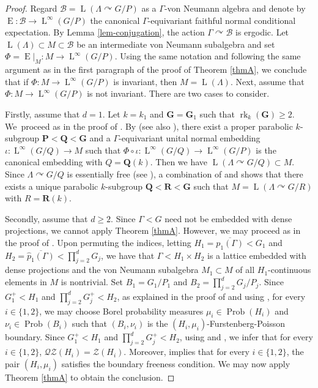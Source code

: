 \documentclass[11pt]{article}
\newcommand{\bG}{\boldsymbol{G}}
\newcommand{\bP}{\boldsymbol{P}}
\newcommand{\bQ}{\boldsymbol{Q}}
\newcommand{\bR}{\boldsymbol{R}}
\theoremstyle{definition}
\DeclareMathOperator{\Prob}{Prob}
\DeclareMathOperator{\rk}{rk}
\DeclareMathOperator{\rE}{ E}
\DeclareMathOperator{\rL}{L}
\begin{document}
\begin{proof}
Regard $\mathscr B = \rL(\Lambda \curvearrowright G/P)$ as a $\Gamma$-von Neumann algebra and denote by \hbox{$\rE : \mathscr B \to \rL^\infty(G/P)$} the canonical $\Gamma$-equivariant faithful normal conditional expectation. By Lemma \ref{lem-conjugation}, the action $\Gamma \curvearrowright \mathscr B$ is ergodic. Let $\rL(\Lambda) \subset M \subset \mathscr B$ be an intermediate von Neumann subalgebra and set $\Phi = \rE|_M : M \to \rL^\infty(G/P)$. \hbox{Using} the same notation and following the same argument as in the first paragraph of the proof of Theorem \ref{thmA}, we conclude that if $\Phi : M \to \rL^\infty(G/P)$ is invariant, then $M = \rL(\Lambda)$. Next, assume that $\Phi : M \to \rL^\infty(G/P)$ is not invariant. There are two cases to consider.

Firstly, assume that $d = 1$. Let $k = k_1$ and $\bG = \bG_1$ such that $\rk_k(\bG) \geq 2$. We~proceed as in the proof of \cite[Th.\,D]{BBH21}. By \cite[Th.\,5.4]{BBH21} (see also \cite[Th.\,B]{BH19}), there exist a proper parabolic $k$-subgroup $\bP < \bQ < \bG$ and a $\Gamma$-equivariant unital normal embedding $\iota : \rL^\infty(G/Q) \to M$ such that $\Phi \circ \iota : \rL^\infty(G/Q) \to \rL^\infty(G/P)$ is the canonical embedding with $Q = \bQ(k)$. Then we have $\rL(\Lambda \curvearrowright G/Q) \subset M$. Since $\Lambda \curvearrowright G/Q$ is essentially free (see \cite[Lem.\,6.2]{BBHP20}), a combination of \cite[Th.\,IV.2.11]{Ma91} and \cite[Th.\,3.6]{Su18} shows that there exists a unique parabolic $k$-subgroup $\bQ < \bR < \bG$ such that $M = \rL(\Lambda \curvearrowright G/R)$ with $R = \bR(k)$.

Secondly, assume that $d \geq 2$. Since $\Gamma < G$ need not be embedded with dense projections, we cannot apply Theorem \ref{thmA}. However, we may proceed as in the proof of \cite[Prop.\,6.1]{BBHP20}. Upon permuting the indices, letting $H_1 = \overline{p_1(\Gamma)} < G_1$ and $H_2 = \overline{\widehat p_1(\Gamma)} < \prod_{j = 2}^d G_j$, we have that $\Gamma < H_1 \times H_2$ is a lattice embedded with dense projections and the von Neumann subalgebra $M_1 \subset M$ of all $H_1$-continuous elements in $M$ is nontrivial. Set $B_1 = G_1/P_1$ and $B_2 = \prod_{j = 2}^d G_j/P_j$. Since $G_1^+ < H_1$ and $\prod_{j = 2}^d G_j^+ < H_2$, as explained in the proof of \cite[Prop.\,6.1]{BBHP20} and using \cite[Cor.\,5.2]{BS04}, for every $i \in \{1, 2\}$, we may choose Borel probability measures $\mu_i \in \Prob(H_i)$ and $\nu_i \in \Prob(B_i)$ such that $(B_i, \nu_i)$ is the $(H_i, \mu_i)$-Furstenberg-Poisson boundary. Since $G_1^+ < H_1$ and $\prod_{j = 2}^d G_j^+ < H_2$, using \cite[Th.\,I.1.5.6(i)]{Ma91} and \cite[Prop.\,4.3]{CM08}, we infer that for every $i \in \{1, 2\}$, $\mathscr{Q}\mathscr{Z}(H_i) = \mathscr Z(H_i)$. Moreover, \cite[Lem.\,6.2]{BBHP20} implies that for every $i \in \{1, 2\}$, the pair $(H_i, \mu_i)$ satisfies the boundary freeness condition. We may now apply Theorem \ref{thmA} to obtain the conclusion.


\end{proof}
\end{document}
